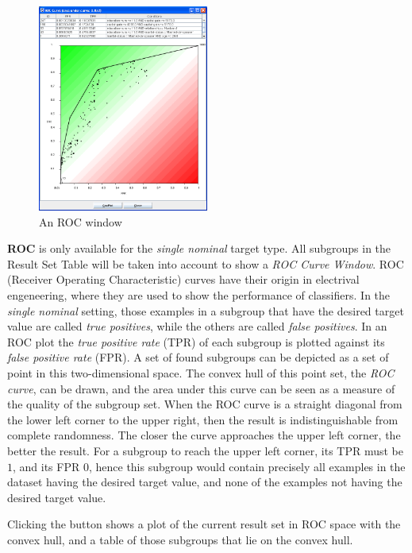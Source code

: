\documentclass{article}
\begin{document}
\begin{figure}[t]
\begin{center}
\includegraphics[width=0.5\textwidth]{rocwindow.png}
\caption{An ROC window}
\end{center}
\label{fig:rocwindow}
\end{figure}

\textbf{ROC} is only available for the \emph{single nominal} target type. 
All subgroups in the Result Set Table will be taken into account to show a
\emph{ROC Curve Window}.  ROC (Receiver Operating Characteristic) curves
have their origin in electrival engeneering, where they are used to show the
performance of classifiers.  In the \emph{single nominal} setting, those
examples in a subgroup that have the desired target value are called
\emph{true positives}, while the others are called \emph{false positives}. 
In an ROC plot the \emph{true positive rate} (TPR) of each subgroup is
plotted against its \emph{false positive rate} (FPR).  A set of found
subgroups can be depicted as a set of point in this two-dimensional space. 
The convex hull of this point set, the \emph{ROC curve}, can be drawn, and
the area under this curve can be seen as a measure of the quality of the
subgroup set.  When the ROC curve is a straight diagonal from the lower left
corner to the upper right, then the result is indistinguishable from
complete randomness.  The closer the curve approaches the upper left corner,
the better the result.  For a subgroup to reach the upper left corner, its
TPR must be $1$, and its FPR $0$, hence this subgroup would contain
precisely all examples in the dataset having the desired target value, and
none of the examples not having the desired target value.

Clicking the button shows a plot of the current result set in ROC space with
the convex hull, and a table of those subgroups that lie on the convex hull.
\end{document}
